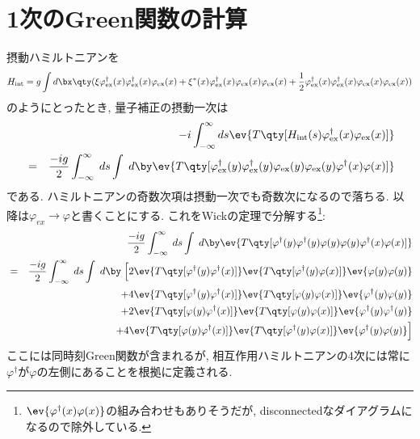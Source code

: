 \documentclass[10.5pt,a4paper]{jreport}
\begin{document}
\section{1次のGreen関数の計算}
摂動ハミルトニアンを
\begin{eqnarray}
  H_{\rm int} = g\int d\bx \qty(\xi \varphi_{\rm ex}^\dagger(x)\varphi_{\rm ex}^\dagger(x)\varphi_{\rm ex}(x) + \xi^*(x)\varphi_{\rm ex}^\dagger(x)\varphi_{\rm ex}(x)\varphi_{\rm ex}(x) + \frac12\varphi_{\rm ex}^\dagger(x)\varphi_{\rm ex}^\dagger(x)\varphi_{\rm ex}(x)\varphi_{\rm ex}(x))
\end{eqnarray}
のようにとったとき, 量子補正の摂動一次は
\begin{eqnarray}
  &&-i\int_{-\infty}^{\infty} ds\ev{T\qty[H_{\rm int}(s)\varphi^\dagger_{\rm ex}(x)\varphi_{\rm ex}(x)]}\\
  &=& \frac{-ig}{2}\int_{-\infty}^{\infty}\; ds\int\; d\by \ev{T\qty[\varphi_{\rm ex}^\dagger(y)\varphi_{\rm ex}^\dagger(y)\varphi_{\rm ex}(y)\varphi_{\rm ex}(y)\varphi^\dagger(x)\varphi(x)]}
\end{eqnarray}
である. ハミルトニアンの奇数次項は摂動一次でも奇数次になるので落ちる. 以降は$\varphi_{ex}\rightarrow \varphi$と書くことにする. これをWickの定理で分解する\footnote{$\ev{\varphi^\dagger(x)\varphi(x)}$の組み合わせもありそうだが, disconnectedなダイアグラムになるので除外している. }:
\begin{eqnarray}
  &&\frac{-ig}{2}\int_{-\infty}^{\infty}\; ds\int\; d\by \ev{T\qty[\varphi^\dagger(y)\varphi^\dagger(y)\varphi(y)\varphi(y)\varphi^\dagger(x)\varphi(x)]}\\
\nonumber  &=& \frac{-ig}{2}\int_{-\infty}^{\infty}\; ds\int\; d\by\; \Bigl[2\ev{T\qty[\varphi^\dagger(y)\varphi^\dagger(x)]}\ev{T\qty[\varphi^\dagger(y)\varphi(x)]}\ev{\varphi(y)\varphi(y)}\\
\nonumber    &&\hspace{3cm}+4\ev{T\qty[\varphi^\dagger(y)\varphi^\dagger(x)]}\ev{T\qty[\varphi(y)\varphi(x)]}\ev{\varphi^\dagger(y)\varphi(y)}\\
\nonumber&&\hspace{3cm}+2\ev{T\qty[\varphi(y)\varphi^\dagger(x)]}\ev{T\qty[\varphi(y)\varphi(x)]}\ev{\varphi^\dagger(y)\varphi^\dagger(y)}\\
&&\hspace{3cm}+ 4\ev{T\qty[\varphi(y)\varphi^\dagger(x)]}\ev{T\qty[\varphi^\dagger(y)\varphi(x)]}\ev{\varphi^\dagger(y)\varphi(y)}\Bigr]\label{Green_1st}
\end{eqnarray}
ここには同時刻Green関数が含まれるが, 相互作用ハミルトニアンの4次には常に$\varphi^\dagger$が$\varphi$の左側にあることを根拠に定義される. 
\end{document}
